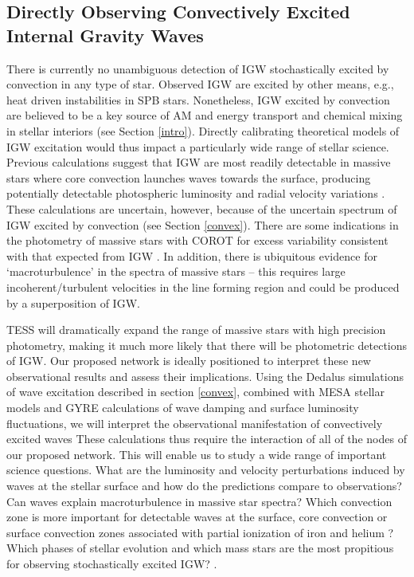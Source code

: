 \subsection{Directly Observing Convectively Excited Internal Gravity Waves}

There is currently no unambiguous detection of IGW stochastically excited by convection in any type of star. {\color{green} Observed IGW are excited by other means, e.g., heat driven instabilities in SPB stars.} Nonetheless, IGW excited by convection are believed to be a key source of AM and energy transport and chemical mixing in stellar interiors (see Section \ref{intro}).  Directly calibrating theoretical models of IGW excitation would thus impact a particularly wide range of stellar science. Previous calculations suggest that IGW are most readily detectable in massive stars where core convection launches waves towards the surface, producing potentially detectable photospheric luminosity and radial velocity variations \citep{samadi2010,shiode2013}. These calculations are uncertain, however, because of the uncertain spectrum of IGW excited by convection (see Section \ref{convex}).  There are some indications in the photometry of massive stars with COROT for excess variability consistent with that expected from IGW \citep{Aerts2015}.  In addition, there is ubiquitous evidence for `macroturbulence' in the spectra of massive stars -- this requires large incoherent/turbulent velocities in the line forming region and could be produced by a superposition of IGW.

TESS will dramatically expand the range of massive stars with high precision photometry, making it much more likely that there will be photometric detections of IGW. Our proposed network is ideally positioned to interpret these new observational results and assess their implications.  Using the Dedalus simulations of wave excitation described in section \ref{convex}, combined with MESA stellar models and GYRE calculations of wave damping and surface luminosity fluctuations, we will interpret the observational manifestation of convectively excited waves {\color{green} These calculations thus require the interaction of all of the nodes of our proposed network.} This will enable us to study a wide range of important science questions. What are the luminosity and velocity perturbations induced by waves at the stellar surface and how do the predictions compare to observations?   Can waves explain macroturbulence in massive star spectra? Which convection zone is more important for detectable waves at the surface, core convection or surface convection zones associated with partial ionization of iron and helium \citep{Cantiello2009}? Which phases of stellar evolution and which mass stars are the most propitious for observing stochastically excited IGW?  .

